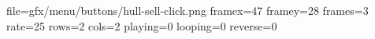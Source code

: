 file=gfx/menu/buttons/hull-sell-click.png
framex=47
framey=28
frames=3
rate=25
rows=2
cols=2
playing=0
looping=0
reverse=0